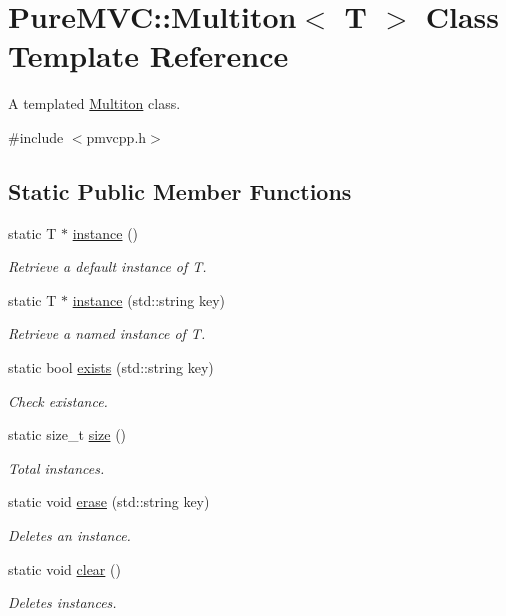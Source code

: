 \hypertarget{class_pure_m_v_c_1_1_multiton}{
\section{PureMVC::Multiton$<$ T $>$ Class Template Reference}
\label{class_pure_m_v_c_1_1_multiton}
}


A templated \hyperlink{class_pure_m_v_c_1_1_multiton}{Multiton} class.  


{\ttfamily \#include $<$pmvcpp.h$>$}\subsection*{Static Public Member Functions}
\begin{DoxyCompactItemize}
\item 
static T $\ast$ \hyperlink{class_pure_m_v_c_1_1_multiton_aea411a3852c095542ec025b14f536f12}{instance} ()
\begin{DoxyCompactList}\small\item\em Retrieve a default instance of T. \item\end{DoxyCompactList}\item 
static T $\ast$ \hyperlink{class_pure_m_v_c_1_1_multiton_a88e3c54b909fee66fef39ccf524377df}{instance} (std::string key)
\begin{DoxyCompactList}\small\item\em Retrieve a named instance of T. \item\end{DoxyCompactList}\item 
static bool \hyperlink{class_pure_m_v_c_1_1_multiton_a3233f3621b8aa564d8da435de122426b}{exists} (std::string key)
\begin{DoxyCompactList}\small\item\em Check existance. \item\end{DoxyCompactList}\item 
static size\_\-t \hyperlink{class_pure_m_v_c_1_1_multiton_a8e6b1a6f3c6bf4751c234d3854a6bf93}{size} ()
\begin{DoxyCompactList}\small\item\em Total instances. \item\end{DoxyCompactList}\item 
static void \hyperlink{class_pure_m_v_c_1_1_multiton_a0e50d82ec223f628312fbf6693fa1477}{erase} (std::string key)
\begin{DoxyCompactList}\small\item\em Deletes an instance. \item\end{DoxyCompactList}\item 
static void \hyperlink{class_pure_m_v_c_1_1_multiton_ac583e3bba8cd9b409f4d78acca48e4c6}{clear} ()
\begin{DoxyCompactList}\small\item\em Deletes instances. \item\end{DoxyCompactList}\end{DoxyCompactItemize}


